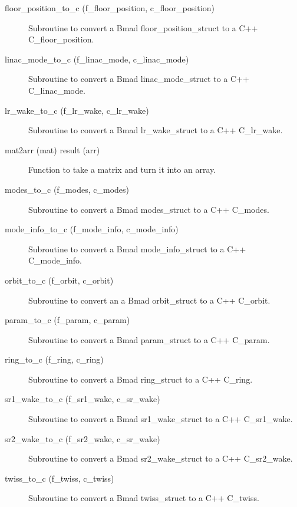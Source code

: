 \begin{description}
\item[floor\_position\_to\_c (f\_floor\_position, c\_floor\_position)] \Newline 
Subroutine to convert a Bmad floor\_position\_struct to a C++ C\_floor\_position.

\item[linac\_mode\_to\_c (f\_linac\_mode, c\_linac\_mode)] \Newline 
Subroutine to convert a Bmad linac\_mode\_struct to a C++ C\_linac\_mode.

\item[lr\_wake\_to\_c (f\_lr\_wake, c\_lr\_wake)] \Newline 
Subroutine to convert a Bmad lr\_wake\_struct to a C++ C\_lr\_wake.

\item[mat2arr (mat) result (arr)] \Newline 
Function to take a matrix and turn it into an array.

\item[modes\_to\_c (f\_modes, c\_modes)] \Newline 
Subroutine to convert a Bmad modes\_struct to a C++ C\_modes.

\item[mode\_info\_to\_c (f\_mode\_info, c\_mode\_info)] \Newline 
Subroutine to convert a Bmad mode\_info\_struct to a C++ C\_mode\_info.

\item[orbit\_to\_c (f\_orbit, c\_orbit)] \Newline 
Subroutine to convert an a Bmad orbit\_struct to a C++ C\_orbit.

\item[param\_to\_c (f\_param, c\_param)] \Newline 
Subroutine to convert a Bmad param\_struct to a C++ C\_param.

\item[ring\_to\_c (f\_ring, c\_ring)] \Newline 
Subroutine to convert a Bmad ring\_struct to a C++ C\_ring.

\item[sr1\_wake\_to\_c (f\_sr1\_wake, c\_sr\_wake)] \Newline 
Subroutine to convert a Bmad sr1\_wake\_struct to a C++ C\_sr1\_wake.

\item[sr2\_wake\_to\_c (f\_sr2\_wake, c\_sr\_wake)] \Newline 
Subroutine to convert a Bmad sr2\_wake\_struct to a C++ C\_sr2\_wake.

\item[twiss\_to\_c (f\_twiss, c\_twiss)] \Newline 
Subroutine to convert a Bmad twiss\_struct to a C++ C\_twiss.


\end{description}

